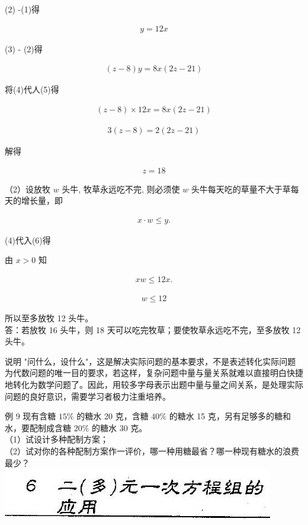 \documentclass[10pt]{article}
\begin{document}
(2) -(1)得

\begin{align*}
y=12 x \tag{3}
\end{align*}

(3) - (2)得

\begin{align*}
(z-8) y=8 x(2 z-21) \tag{4}
\end{align*}

将(4)代人(5)得

\begin{align*}
(z-8) \times 12 x=8 x(2 z-21) \tag{5}
\end{align*}

\begin{align*}
3(z-8)=2(2 z-21)
\end{align*}

解得

\begin{align*}
z=18
\end{align*}

（2）设放牧 $w$ 头牛, 牧草永远吃不完, 则必须使 $w$ 头牛每天吃的草量不大于草每天的增长量，即

\begin{align*}
x \cdot w \leqslant y . \tag{6}
\end{align*}

(4)代入(6)得

由 $x>0$ 知

\begin{align*}
x w \leqslant 12 x .
\end{align*}

\begin{align*}
w \leqslant 12
\end{align*}

所以至多放牧 12 头牛。\\
答：若放牧 16 头牛，则 18 天可以吃完牧草；要使牧草永远吃不完，至多放牧 12 头牛。

说明 "问什么，设什么"，这是解决实际问题的基本要求，不是表述转化实际问题为代数问题的唯一目的要求，若这样，复杂问题中量与量关系就难以直接明白快捷地转化为数学问题了。因此，用较多字母表示出题中量与量之间关系，是处理实际问题的良好意识，需要学习者极力注重培养。

例 9 现有含糖 $15 \%$ 的糖水 20 克，含糖 $40 \%$ 的糖水 15 克，另有足够多的糖和水，要配制成含糖 $20 \%$ 的糖水 30 克。\\
（1）试设计多种配制方案；\\
（2）试对你的各种配制方案作一评价，哪一种用糖最省？哪一种现有糖水的浪费最少？\\
\includegraphics[max width=\textwidth, center]{2024_10_30_26b590fd1106d28139f0g-037}
\end{document}
